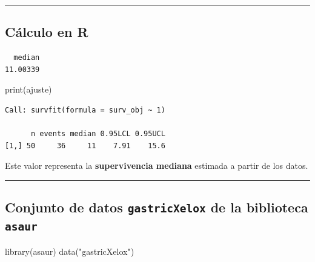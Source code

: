 \documentclass[
]{article}
\newenvironment{Shaded}{\begin{snugshade}}{\end{snugshade}}
\newcommand{\FunctionTok}[1]{\textcolor[rgb]{0.28,0.35,0.67}{#1}}
\newcommand{\NormalTok}[1]{\textcolor[rgb]{0.00,0.23,0.31}{#1}}
\newcommand{\SpecialCharTok}[1]{\textcolor[rgb]{0.37,0.37,0.37}{#1}}
\newcommand{\StringTok}[1]{\textcolor[rgb]{0.13,0.47,0.30}{#1}}
\begin{document}
\begin{center}\rule{0.5\linewidth}{0.5pt}\end{center}

\subsection{Cálculo en R}\label{cuxe1lculo-en-r}

\begin{Shaded}
\end{Shaded}

\begin{verbatim}
  median 
11.00339 
\end{verbatim}

\begin{Shaded}
\begin{Highlighting}[]
\FunctionTok{print}\NormalTok{(ajuste)}
\end{Highlighting}
\end{Shaded}

\begin{verbatim}
Call: survfit(formula = surv_obj ~ 1)

      n events median 0.95LCL 0.95UCL
[1,] 50     36     11    7.91    15.6
\end{verbatim}

Este valor representa la \textbf{supervivencia mediana} estimada a
partir de los datos.

\begin{center}\rule{0.5\linewidth}{0.5pt}\end{center}

\subsection{\texorpdfstring{Conjunto de datos \texttt{gastricXelox} de
la biblioteca
\texttt{asaur}}{Conjunto de datos gastricXelox de la biblioteca asaur}}\label{conjunto-de-datos-gastricxelox-de-la-biblioteca-asaur}

\begin{Shaded}
\begin{Highlighting}[]
\FunctionTok{library}\NormalTok{(asaur)}
\FunctionTok{data}\NormalTok{(}\StringTok{"gastricXelox"}\NormalTok{)}
\end{Highlighting}
\end{Shaded}
\end{document}
